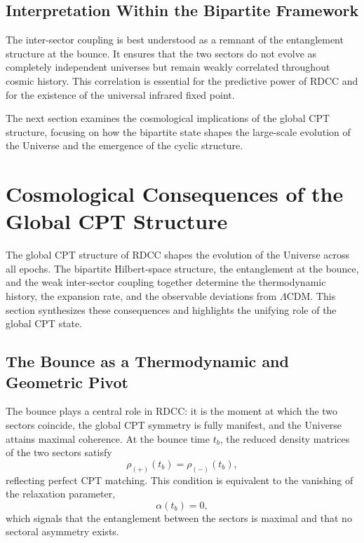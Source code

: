 \documentclass[11pt,a4paper]{article}
\begin{document}
\subsection{Interpretation Within the Bipartite Framework}

The inter-sector coupling is best understood as a remnant of the entanglement structure at the bounce. It ensures that the two sectors do not evolve as completely independent universes but remain weakly correlated throughout cosmic history. This correlation is essential for the predictive power of RDCC and for the existence of the universal infrared fixed point.

The next section examines the cosmological implications of the global CPT structure, focusing on how the bipartite state shapes the large-scale evolution of the Universe and the emergence of the cyclic structure.

\section{Cosmological Consequences of the Global CPT Structure}

The global CPT structure of RDCC shapes the evolution of the Universe across all epochs. The bipartite Hilbert-space structure, the entanglement at the bounce, and the weak inter-sector coupling together determine the thermodynamic history, the expansion rate, and the observable deviations from $\Lambda$CDM. This section synthesizes these consequences and highlights the unifying role of the global CPT state.

\subsection{The Bounce as a Thermodynamic and Geometric Pivot}

The bounce plays a central role in RDCC: it is the moment at which the two sectors coincide,
the global CPT symmetry is fully manifest, and the Universe attains maximal coherence. At the
bounce time $t_b$, the reduced density matrices of the two sectors satisfy
\begin{equation}
    \rho_{(+)}(t_b) = \rho_{(-)}(t_b),
\end{equation}
reflecting perfect CPT matching. This condition is equivalent to the vanishing of the relaxation
parameter,
\begin{equation}
    \alpha(t_b) = 0,
\end{equation}
which signals that the entanglement between the sectors is maximal and that no sectoral
asymmetry exists.
\end{document}
